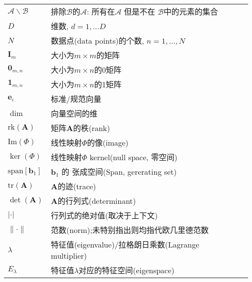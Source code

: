 \begin{table}
\begin{tabular}{llp{\textwidth}}
    $\mathcal{A} \backslash \mathcal{B}$ & 排除$\mathcal{B}$的$\mathcal{A}$: 
            所有在$\mathcal{A}$ 但是不在 $\mathcal{B}$中的元素的集合 \\
    $D$ & 维数, $d = 1, ... D$ \\
    $N$ & 数据点(data points)的个数, $n = 1,..., N$ \\
    \hline
    $\boldsymbol{I}_m$ & 大小为$m \times m$的矩阵 \\
    $\boldsymbol{0}_{m,n}$ & 大小为$m \times n$的0矩阵 \\
    $\boldsymbol{1}_{m,n}$ & 大小为$m \times n$的1矩阵 \\
    $\boldsymbol{e}_i$ & 标准/规范向量 \\
    $\dim$ & 向量空间的维 \\
    $\mathrm{rk}(\boldsymbol{A})$ & 矩阵$\boldsymbol{A}$的秩(rank) \\
    $\mathrm{Im}(\Phi)$ & 线性映射$\Phi$的像(image) \\
    $\ker(\Phi)$ & 线性映射$\Phi$ kernel(null space, 零空间) \\
    $\mathrm{span}[\boldsymbol{b}_1]$ & $\boldsymbol{b}_1$ 的 张成空间(Span, gererating set) \\
    $\mathrm{tr}(\boldsymbol{A})$ & $\boldsymbol{A}$的迹(trace) \\
    $\det(\boldsymbol{A})$ & $\boldsymbol{A}$的行列式(determinant) \\
    $|\cdot|$ & 行列式的绝对值(取决于上下文) \\
    $\| \cdot \|$ & 范数(norm);未特别指出则均指代欧几里德范数 \\
    $\lambda$ & 特征值(eigenvalue)/拉格朗日乘数(Lagrange multiplier) \\
    $E_\lambda$ & 特征值$\lambda$对应的特征空间(eigenspace) \\
    \hline
\end{tabular}
\end{table}

